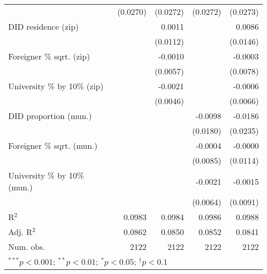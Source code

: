 \begin{tabular}{l D{.}{.}{4.11} D{.}{.}{4.11} D{.}{.}{4.11} D{.}{.}{4.11}}
                                  & (0.0270)          & (0.0272)          & (0.0272)          & (0.0273)          \\
DID residence (zip)               &                   & 0.0011            &                   & 0.0086            \\
                                  &                   & (0.0112)          &                   & (0.0146)          \\
Foreigner \% sqrt. (zip)          &                   & -0.0010           &                   & -0.0003           \\
                                  &                   & (0.0057)          &                   & (0.0078)          \\
University \% by 10\% (zip)       &                   & -0.0021           &                   & -0.0006           \\
                                  &                   & (0.0046)          &                   & (0.0066)          \\
DID proportion (mun.)             &                   &                   & -0.0098           & -0.0186           \\
                                  &                   &                   & (0.0180)          & (0.0235)          \\
Foreigner \% sqrt. (mun.)         &                   &                   & -0.0004           & -0.0000           \\
                                  &                   &                   & (0.0085)          & (0.0114)          \\
University \% by 10\% (mun.)      &                   &                   & -0.0021           & -0.0015           \\
                                  &                   &                   & (0.0064)          & (0.0091)          \\
\midrule
R$^2$                             & 0.0983            & 0.0984            & 0.0986            & 0.0988            \\
Adj. R$^2$                        & 0.0862            & 0.0850            & 0.0852            & 0.0841            \\
Num. obs.                         & 2122              & 2122              & 2122              & 2122              \\
\bottomrule
{}
\end{tabular}
